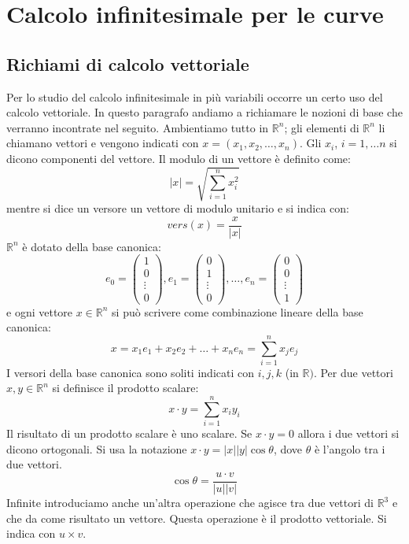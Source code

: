 \documentclass[a4paper]{article}
\numberwithin{equation}{subsection}
\begin{document}
\pagebreak


\section{Calcolo infinitesimale per le curve}

\subsection{Richiami di calcolo vettoriale}

Per lo studio del calcolo infinitesimale in più variabili occorre un certo uso del calcolo vettoriale.
In questo paragrafo andiamo a richiamare le nozioni di base che verranno incontrate nel seguito.
Ambientiamo tutto in $\mathbb{R}^n$; gli elementi di $\mathbb{R}^n$ li chiamano vettori e vengono
indicati con $x = (x_1, x_2, \dots, x_n)$. Gli $x_i$, $i = 1, \dots n$ si dicono componenti del vettore. 
Il modulo di un vettore è definito come:
\[|x| = \sqrt{\sum_{i = 1}^{n}x_i^2}\]
mentre si dice un versore un vettore di modulo unitario e si indica con:
\[vers(x) = \frac{x}{|x|}\]
$\mathbb{R}^n$ è dotato della base canonica:
\[e_0 = \begin{pmatrix}
    1\\
    0\\
    \vdots\\
    0
\end{pmatrix}, e_1 = \begin{pmatrix}
    0\\
    1\\
    \vdots\\
    0
\end{pmatrix}, \dots, e_n = \begin{pmatrix}
    0\\
    0\\
    \vdots\\
    1
\end{pmatrix}\] 
e ogni vettore $x \in \mathbb{R}^n$ si può scrivere come combinazione lineare della base canonica:
\[x = x_1e_1 + x_2e_2 + \dots + x_ne_n = \sum_{i=1}^{n} x_je_j\]
I versori della base canonica sono soliti indicati con $i, j, k$ (in $\mathbb{R})$. 
Per due vettori $x, y \in \mathbb{R}^n$ si definisce il prodotto scalare:
\[x \cdot y = \sum_{i=1}^{n}x_iy_i\]
Il risultato di un prodotto scalare è uno scalare. 
Se $x \cdot y = 0$ allora i due vettori si dicono ortogonali. 
Si usa la notazione $x \cdot y = |x||y|\cos{\theta}$, dove $\theta$ è l'angolo tra i due vettori.
\[\cos{\theta} = \frac{u \cdot v}{|u||v|}\]
Infinite introduciamo anche un'altra operazione che agisce tra due vettori di $\mathbb{R}^3$ e che da come risultato
un vettore. Questa operazione è il prodotto vettoriale. Si indica con $u \times v$.
\end{document}
